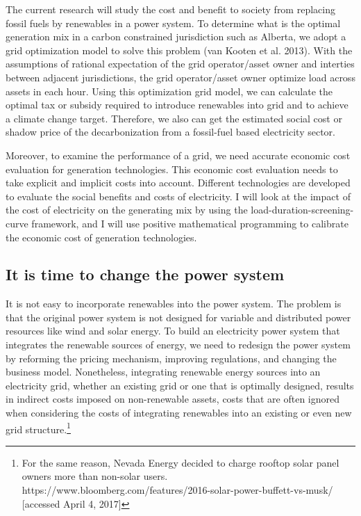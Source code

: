\documentclass[10pt,letter]{article}
\begin{document}
The current research will study the cost and benefit to society from
replacing fossil fuels by renewables in a power system. To determine
what is the optimal generation mix in a carbon constrained jurisdiction
such as Alberta, we adopt a grid optimization model to solve this
problem (van Kooten et al. 2013). With the assumptions of rational
expectation of the grid operator/asset owner and interties between
adjacent jurisdictions, the grid operator/asset owner optimize load
across assets in each hour. Using this optimization grid model, we can
calculate the optimal tax or subsidy required to introduce renewables
into grid and to achieve a climate change target. Therefore, we also can
get the estimated social cost or shadow price of the decarbonization
from a fossil-fuel based electricity sector.

Moreover, to examine the performance of a grid, we need accurate
economic cost evaluation for generation technologies. This economic cost
evaluation needs to take explicit and implicit costs into account.
Different technologies are developed to evaluate the social benefits and
costs of electricity. I will look at the impact of the cost of
electricity on the generating mix by using the
load-duration-screening-curve framework, and I will use positive
mathematical programming to calibrate the economic cost of generation
technologies.

\subsection{It is time to change the power
system}\label{it-is-time-to-change-the-power-system}

It is not easy to incorporate renewables into the power system. The
problem is that the original power system is not designed for variable
and distributed power resources like wind and solar energy. To build an
electricity power system that integrates the renewable sources of
energy, we need to redesign the power system by reforming the pricing
mechanism, improving regulations, and changing the business model.
Nonetheless, integrating renewable energy sources into an electricity
grid, whether an existing grid or one that is optimally designed,
results in indirect costs imposed on non-renewable assets, costs that
are often ignored when considering the costs of integrating renewables
into an existing or even new grid structure.\footnote{For the same
  reason, Nevada Energy decided to charge rooftop solar panel owners
  more than non-solar users.
  https://www.bloomberg.com/features/2016-solar-power-buffett-vs-musk/
  {[}accessed April 4, 2017{]}}
\end{document}
